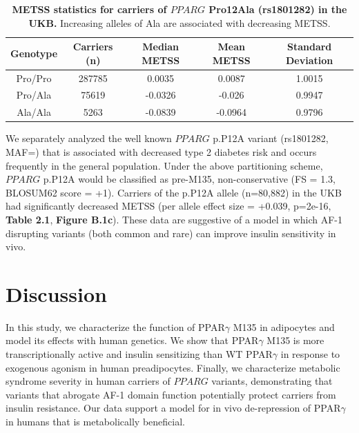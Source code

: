 \clearpage
\begin{table}[t]
    \centering
    \caption[METSS statistics for carriers of \texorpdfstring{\(PPARG\)}{PPARG} Pro12Ala (rs1801282) in the UKB.]{\textbf{METSS statistics for carriers of \texorpdfstring{\(PPARG\)}{PPARG} Pro12Ala (rs1801282) in the UKB.}  Increasing alleles of Ala are associated with decreasing METSS.
  }
    \begin{tabular}{|c|c|c|c|c|}
    \hline
        Genotype & Carriers (n) & Median METSS & Mean METSS & Standard Deviation \\ \hline
        Pro/Pro & 287785 & 0.0035 & 0.0087 & 1.0015 \\ \hline
        Pro/Ala & 75619 & -0.0326 & -0.026 & 0.9947 \\ \hline
        Ala/Ala & 5263 & -0.0839 & -0.0964 & 0.9796 \\ \hline
    \end{tabular}
\end{table}

We separately analyzed the well known \(PPARG\) p.P12A variant (rs1801282, MAF=) that is associated with decreased type 2 diabetes risk\cite{Altshuler2000-kl} and occurs frequently in the general population. Under the above partitioning scheme, \(PPARG\) p.P12A would be classified as pre-M135, non-conservative (FS = 1.3, BLOSUM62 score = +1). Carriers of the p.P12A allele (n=80,882) in the UKB had significantly decreased METSS (per allele effect size = +0.039, p=2e-16, \textbf{Table 2.1}, \textbf{Figure B.1c}). These data are suggestive of a model in which AF-1 disrupting variants (both common and rare) can improve insulin sensitivity in vivo.


\section{Discussion}

In this study, we characterize the function of PPAR$\gamma$ M135 in adipocytes and model its effects with human genetics. We show that PPAR$\gamma$ M135 is more transcriptionally active and insulin sensitizing than WT PPAR$\gamma$ in response to exogenous agonism in human preadipocytes. Finally, we characterize metabolic syndrome severity in human carriers of \(PPARG\) variants, demonstrating that variants that abrogate AF-1 domain function potentially protect carriers from insulin resistance. Our data support a model for in vivo de-repression of PPAR$\gamma$ in humans that is metabolically beneficial.  

